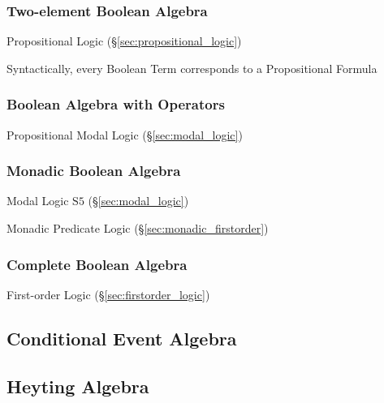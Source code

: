 \subsubsection{Two-element Boolean Algebra}\label{sec:twoelement_boolean}

Propositional Logic (\S\ref{sec:propositional_logic})

Syntactically, every Boolean Term corresponds to a Propositional
Formula



\subsubsection{Boolean Algebra with Operators}\label{sec:boolean_with_operators}

Propositional Modal Logic (\S\ref{sec:modal_logic})



\subsubsection{Monadic Boolean Algebra}\label{sec:monadic_boolean}

Modal Logic $\mathrm{S5}$ (\S\ref{sec:modal_logic})

Monadic Predicate Logic (\S\ref{sec:monadic_firstorder})



\subsubsection{Complete Boolean Algebra}\label{sec:complete_boolean}

First-order Logic (\S\ref{sec:firstorder_logic})



\subsection{Conditional Event Algebra}\label{sec:conditional_event_algebra}

\subsection{Heyting Algebra}\label{sec:heyting_algebra}

